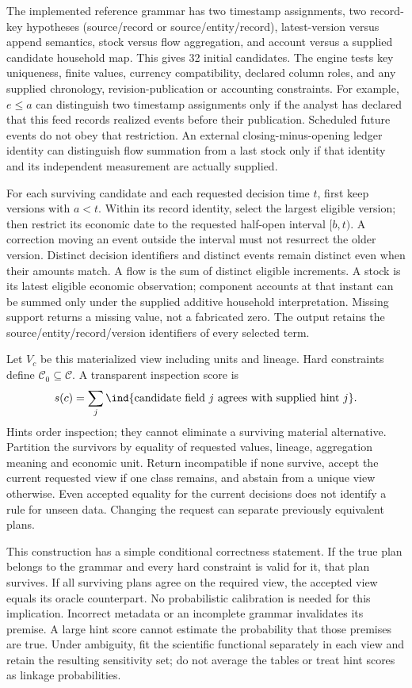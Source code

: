 The implemented reference grammar has two timestamp assignments, two
record-key hypotheses (source/record or source/entity/record), latest-version
versus append semantics, stock versus flow aggregation, and account versus
a supplied candidate household map. This gives 32 initial candidates.
The engine tests key uniqueness, finite values, currency compatibility,
declared column roles, and any supplied chronology, revision-publication
or accounting constraints. For example, $e\le a$ can distinguish two
timestamp assignments only if the analyst has declared that this feed
records realized events before their publication. Scheduled future events
do not obey that restriction. An external closing-minus-opening ledger
identity can distinguish flow summation from a last stock only if that
identity and its independent measurement are actually supplied.

For each surviving candidate and each requested decision time $t$, first
keep versions with $a<t$. Within its record identity, select the largest
eligible version; then restrict its economic date to the requested
half-open interval $[b,t)$. A correction moving an event outside the
interval must not resurrect the older version. Distinct decision identifiers
and distinct events remain distinct even when their amounts match.
A flow is the sum of distinct eligible increments. A stock is its latest
eligible economic observation; component accounts at that instant can be
summed only under the supplied additive household interpretation. Missing
support returns a missing value, not a fabricated zero. The output retains
the source/entity/record/version identifiers of every selected term.

Let $V_c$ be this materialized view including units and lineage. Hard
constraints define $\mathcal C_0\subseteq\mathcal C$. A transparent
inspection score is
\[
 s(c)=\sum_j\ind\{\text{candidate field }j\text{ agrees with supplied hint }j\}.
\]
Hints order inspection; they cannot eliminate a surviving material
alternative. Partition the survivors by equality of requested values,
lineage, aggregation meaning and economic unit. Return incompatible if
none survive, accept the current requested view if one class remains,
and abstain from a unique view otherwise. Even accepted equality for the
current decisions does not identify a rule for unseen data. Changing the
request can separate previously equivalent plans.

This construction has a simple conditional correctness statement. If the
true plan belongs to the grammar and every hard constraint is valid for
it, that plan survives. If all surviving plans agree on the required view,
the accepted view equals its oracle counterpart. No probabilistic calibration
is needed for this implication. Incorrect metadata or an incomplete grammar
invalidates its premise. A large hint score cannot estimate the probability
that those premises are true. Under ambiguity, fit the scientific functional
separately in each view and retain the resulting sensitivity set; do not
average the tables or treat hint scores as linkage probabilities.

